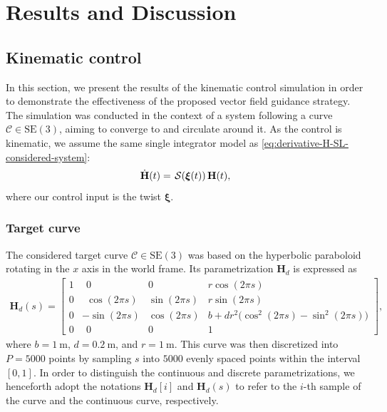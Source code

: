 \chapter{Results and Discussion}\label{ch:results}
\section{Kinematic control}
In this section, we present the results of the kinematic control simulation in order to demonstrate the effectiveness of the proposed vector field guidance strategy. The simulation was conducted in the context of a system following a curve $\mathcal{C}\in\text{SE}(3)$, aiming to converge to and circulate around it. As the control is kinematic, we assume the same single integrator model as \eqref{eq:derivative-H-SL-considered-system}:
\begin{align}
    \dot{\mathbf{H}}(t) = \SL[\boldsymbol{\xi}(t)]\mathbf{H}(t),
\end{align}
where our control input is the twist $\boldsymbol{\xi}$.
\subsection{Target curve}
The considered target curve $\mathcal{C}\in\text{SE}(3)$ was based on the hyperbolic paraboloid rotating in the $x$ axis in the world frame. Its parametrization $\mathbf{H}_d$ is expressed as 
\begin{align}
    \mathbf{H}_d(s) = \begin{bmatrix}
        1 & \ \ 0 & 0 & r\cos(2\pi s)\\
        0 & \ \ \cos(2\pi s) & \sin(2\pi s) & r\sin(2\pi s)\\
        0 & -\sin(2\pi s) & \cos(2\pi s) & b + dr^2\bigl(\cos^2(2\pi s) - \sin^2(2\pi s)\bigr)\\
        0 & \ \ 0 & 0 & 1
    \end{bmatrix},
\end{align}
where $b=\qty{1}{\meter}$, $d=\qty{0.2}{\meter}$, and $r=\qty{1}{\meter}$. This curve was then discretized into $P=\num{5000}$ points by sampling $s$ into $\num{5000}$ evenly spaced points within the interval $[0, 1]$. In order to distinguish the continuous and discrete parametrizations, we henceforth adopt the notations $\mathbf{H}_d[i]$ and $\mathbf{H}_d(s)$ to refer to the $i$-th sample of the curve and the continuous curve, respectively.
